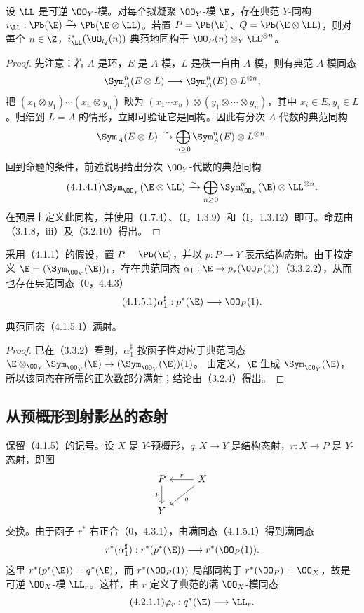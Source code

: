 设 $\LL$ 是可逆 $\OO_Y$-模。对每个拟凝聚 $\OO_Y$-模 $\E$，存在典范 $Y$-同构
$i_{\LL}:\Pb(\E)\xrightarrow{\sim}\Pb(\E\otimes\LL)$。若置 $P=\Pb(\E)$、$Q=\Pb(\E\otimes\LL)$，则对每个 $n\in\Z$，$i_{\LL}^*(\OO_Q(n))$ 典范地同构于 $\OO_P(n)\otimes_Y\LL^{\otimes n}$。
\begin{proof}
先注意：若 $A$ 是环，$E$ 是 $A$-模，$L$ 是秩一自由 $A$-模，则有典范 $A$-模同态
\[
\Sym_A^n(E\otimes L)\longrightarrow\Sym_A^n(E)\otimes L^{\otimes n},
\]
把 $(x_1\otimes y_1)\cdots(x_n\otimes y_n)$ 映为
$(x_1\cdots x_n)\otimes(y_1\otimes\cdots\otimes y_n)$，其中 $x_i\in E,y_i\in L$。归结到 $L=A$ 的情形，立即可验证它是同构。因此有分次 $A$-代数的典范同构
\[
\Sym_A(E\otimes L)\xrightarrow{\sim}\bigoplus_{n\geq0}\Sym_A^n(E)\otimes L^{\otimes n}.
\]
回到命题的条件，前述说明给出分次 $\OO_Y$-代数的典范同构
\begin{equation}\tag{4.1.4.1}
\Sym_{\OO_Y}(\E\otimes\LL)\xrightarrow{\sim}
\bigoplus_{n\geq0}\Sym_{\OO_Y}^n(\E)\otimes\LL^{\otimes n}.
\end{equation}
在预层上定义此同构，并使用（1.7.4）、（I，1.3.9）和（I，1.3.12）即可。命题由（3.1.8，iii）及（3.2.10）得出。
\end{proof}

采用（4.1.1）的假设，置 $P=\Pb(\E)$，并以 $p:P\to Y$ 表示结构态射。由于按定义 $\E=(\Sym_{\OO_Y}(\E))_1$，存在典范同态 $\alpha_1:\E\to p_*(\OO_P(1))$（3.3.2.2），从而也存在典范同态（0，4.4.3）
\begin{equation}\tag{4.1.5.1}\alpha_1^\sharp:p^*(\E)\longrightarrow\OO_P(1).\end{equation}

典范同态（4.1.5.1）满射。
\begin{proof}
已在（3.3.2）看到，$\alpha_1^\sharp$ 按函子性对应于典范同态
$\E\otimes_{\OO_Y}\Sym_{\OO_Y}(\E)\to(\Sym_{\OO_Y}(\E))(1)$。
由定义，$\E$ 生成 $\Sym_{\OO_Y}(\E)$，所以该同态在所需的正次数部分满射；结论由（3.2.4）得出。
\end{proof}

\subsection{从预概形到射影丛的态射}
保留（4.1.5）的记号。设 $X$ 是 $Y$-预概形，$q:X\to Y$ 是结构态射，$r:X\to P$ 是 $Y$-态射，即图
\[
\begin{tikzcd}
P \arrow[d,"p"'] & X \arrow[l,"r"'] \arrow[dl,"q"]\\
Y &
\end{tikzcd}
\]
交换。由于函子 $r^*$ 右正合（0，4.3.1），由满同态（4.1.5.1）得到满同态
\[
r^*(\alpha_1^\sharp):r^*(p^*(\E))\longrightarrow r^*(\OO_P(1)).
\]
这里 $r^*(p^*(\E))=q^*(\E)$，而 $r^*(\OO_P(1))$ 局部同构于 $r^*(\OO_P)=\OO_X$，故是可逆 $\OO_X$-模 $\LL_r$。这样，由 $r$ 定义了典范的满 $\OO_X$-模同态
\begin{equation}\tag{4.2.1.1}\varphi_r:q^*(\E)\longrightarrow\LL_r.\end{equation}

